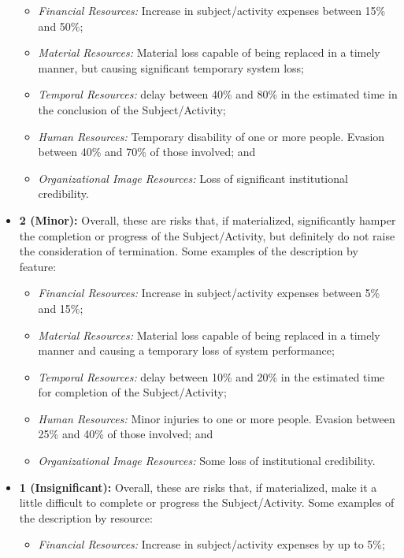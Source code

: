 \begin{itemize}
    \begin{itemize}
       \item  \textit{Financial Resources:} Increase in subject/activity expenses between 15\% and 50\%;
       \item  \textit{Material Resources:} Material loss capable of being replaced in a timely manner, but causing significant temporary system loss;
       \item  \textit{Temporal Resources: }delay between 40\% and 80\% in the estimated time in the conclusion of the Subject/Activity;
       \item  \textit{Human Resources: }Temporary disability of one or more people. Evasion between 40\% and 70\% of those involved; and
       \item  \textit{Organizational Image Resources:} Loss of significant institutional credibility.
    \end{itemize}
    \item \textbf{2 (Minor):} Overall, these are risks that, if materialized, significantly hamper the completion or progress of the Subject/Activity, but definitely do not raise the consideration of termination. Some examples of the description by feature:
    \begin{itemize}
       \item  \textit{Financial Resources: }Increase in subject/activity expenses between 5\% and 15\%;
       \item  \textit{Material Resources: }Material loss capable of being replaced in a timely manner and causing a temporary loss of system performance;
       \item  \textit{Temporal Resources:} delay between 10\% and 20\% in the estimated time for completion of the Subject/Activity;
       \item \textit{ Human Resources:} Minor injuries to one or more people. Evasion between 25\% and 40\% of those involved; and
       \item  \textit{Organizational Image Resources:} Some loss of institutional credibility.
    \end{itemize}
    \item \textbf{1 (Insignificant):} Overall, these are risks that, if materialized, make it a little difficult to complete or progress the Subject/Activity. Some examples of the description by resource:
    \begin{itemize}
         \item  \textit{Financial Resources:} Increase in subject/activity expenses by up to 5\%;

\end{itemize}
\end{itemize}
